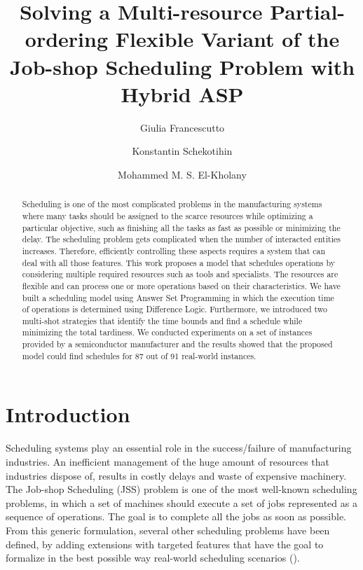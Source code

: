 \documentclass[submission,copyright,creativecommons]{eptcs}
\title{Solving a Multi-resource Partial-ordering Flexible Variant of the Job-shop Scheduling Problem with Hybrid ASP}
\author{Giulia Francescutto
\institute{Siemens AG {\"O}sterreich\\ Vienna, Austria}
\email{giulia.francescutto@siemens.com}
\and
Konstantin Schekotihin
\institute{Univeristy of Klagenfurt\\
Klagenfurt, Austria}
\email{konstantin.schekotihin@aau.at}
\and
Mohammed M. S. El-Kholany
\institute{Univeristy of Klagenfurt\\ Klagenfurt, Austria}
\institute{Cairo University\\ Cairo, Egypt.}
\email{mohammed.el-kholany@aau.at}
}
\begin{document}
\maketitle

\begin{abstract}
  Scheduling is one of the most complicated problems in the manufacturing systems where many tasks should be assigned to the scarce resources while optimizing a particular objective, such as finishing all the tasks as fast as possible or minimizing the delay. The scheduling problem gets complicated when the number of interacted entities increases. Therefore, efficiently controlling these aspects requires a system that can deal with all those features. This work proposes a model that schedules operations by considering multiple required resources such as tools and specialists. The resources are flexible and can process one or more operations based on their characteristics. We have built a scheduling model using Answer Set Programming in which the execution time of operations is determined using Difference Logic. Furthermore, we introduced two multi-shot strategies that identify the time bounds and find a schedule while minimizing the total tardiness. We conducted experiments on a set of instances provided by a semiconductor manufacturer and the results showed that the proposed model could find schedules for 87 out of 91 real-world instances.
\end{abstract}

\section{Introduction}
Scheduling systems play an essential role in the success/failure of manufacturing industries. An inefficient management of the huge amount of resources that industries dispose of, results in costly delays and waste of expensive machinery. The Job-shop Scheduling (JSS) problem is one of the most well-known scheduling problems, in which a set of machines should execute a set of jobs represented as a sequence of operations. The goal is to complete all the jobs as soon as possible. From this generic formulation, several other scheduling problems have been defined, by adding extensions with targeted features that have the goal to formalize in the best possible way real-world scheduling scenarios (\cite{brucker1990job}). %
\end{document}
